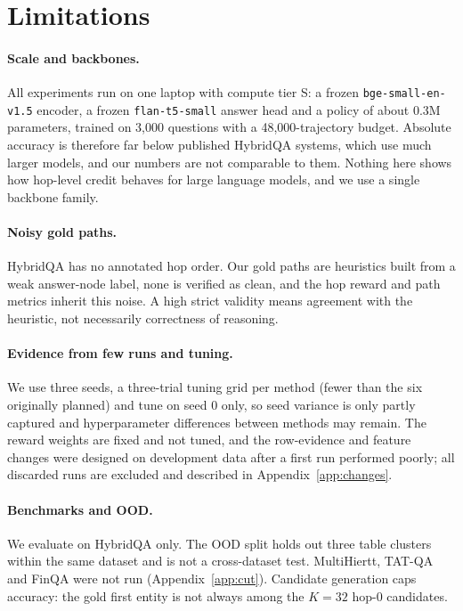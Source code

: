 \section*{Limitations}
\label{sec:limitations}

\paragraph{Scale and backbones.}
All experiments run on one laptop with compute tier S: a frozen \texttt{bge-small-en-v1.5} encoder, a frozen \texttt{flan-t5-small} answer head and a policy of about 0.3M parameters, trained on 3{,}000 questions with a 48{,}000-trajectory budget.
Absolute accuracy is therefore far below published HybridQA systems, which use much larger models, and our numbers are not comparable to them.
Nothing here shows how hop-level credit behaves for large language models, and we use a single backbone family.

\paragraph{Noisy gold paths.}
HybridQA has no annotated hop order. Our gold paths are heuristics built from a weak answer-node label, none is verified as clean, and the hop reward and path metrics inherit this noise.
A high strict validity means agreement with the heuristic, not necessarily correctness of reasoning.

\paragraph{Evidence from few runs and tuning.}
We use three seeds, a three-trial tuning grid per method (fewer than the six originally planned) and tune on seed 0 only, so seed variance is only partly captured and hyperparameter differences between methods may remain.
The reward weights are fixed and not tuned, and the row-evidence and feature changes were designed on development data after a first run performed poorly; all discarded runs are excluded and described in Appendix~\ref{app:changes}.

\paragraph{Benchmarks and OOD.}
We evaluate on HybridQA only. The OOD split holds out three table clusters within the same dataset and is not a cross-dataset test.
MultiHiertt, TAT-QA and FinQA were not run (Appendix~\ref{app:cut}).
Candidate generation caps accuracy: the gold first entity is not always among the $K=32$ hop-0 candidates.

